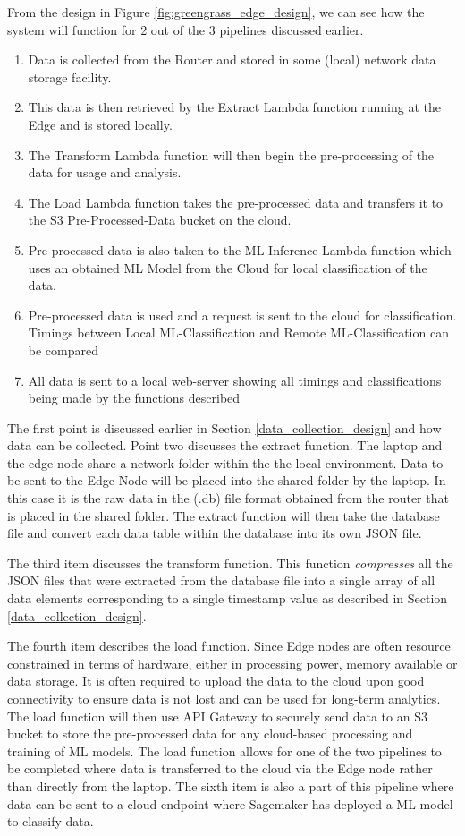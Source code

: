 From the design in Figure \ref{fig:greengrass_edge_design}, we can see how the system will function for 2 out of the 3 pipelines discussed earlier.
\begin{enumerate}
    \item Data is collected from the Router and stored in some (local) network data storage facility.
    \item This data is then retrieved by the Extract Lambda function running at the Edge and is stored locally.
    \item The Transform Lambda function will then begin the pre-processing of the data for usage and analysis.
    \item The Load Lambda function takes the pre-processed data and transfers it to the S3 Pre-Processed-Data bucket on the cloud.
    \item Pre-processed data is also taken to the ML-Inference Lambda function which uses an obtained ML Model from the Cloud for local classification of the data.
    \item Pre-processed data is used and a request is sent to the cloud for classification. Timings between Local ML-Classification and Remote ML-Classification can be compared
    \item All data is sent to a local web-server showing all timings and classifications being made by the functions described
\end{enumerate}

The first point is discussed earlier in Section \ref{data_collection_design} and how data can be collected. Point two discusses the extract function. The laptop and the edge node share a network folder within the the local environment. Data to be sent to the Edge Node will be placed into the shared folder by the laptop. In this case it is the raw data in the (.db) file format obtained from the router that is placed in the shared folder. The extract function will then take the database file and convert each data table within the database into its own JSON file.

The third item discusses the transform function. This function \textit{compresses} all the JSON files that were extracted from the database file into a single array of all data elements corresponding to a single timestamp value as described in Section \ref{data_collection_design}. 

The fourth item describes the load function. Since Edge nodes are often resource constrained in terms of hardware, either in processing power, memory available or data storage. It is often required to upload the data to the cloud upon good connectivity to ensure data is not lost and can be used for long-term analytics. The load function will then use API Gateway to securely send data to an S3 bucket to store the pre-processed data for any cloud-based processing and training of ML models. The load function allows for one of the two pipelines to be completed where data is transferred to the cloud via the Edge node rather than directly from the laptop. The sixth item is also a part of this pipeline where data can be sent to a cloud endpoint where Sagemaker has deployed a ML model to classify data. 

